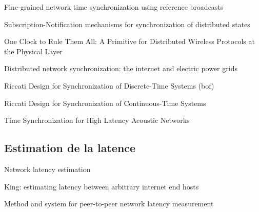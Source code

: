 Fine-grained network time synchronization using reference broadcasts

Subscription-Notification mechanisms for synchronization of distributed states

One Clock to Rule Them All: A Primitive for Distributed Wireless Protocols at the Physical Layer

Distributed network synchronization: the internet and electric power grids

Riccati Design for Synchronization of Discrete-Time Systems (bof)

Riccati Design for Synchronization of Continuous-Time Systems

Time Synchronization for High Latency Acoustic Networks


\subsection{Estimation de la latence}
\label{section:latence}
Network latency estimation %

King: estimating latency between arbitrary internet end hosts

Method and system for peer-to-peer network latency measurement %

